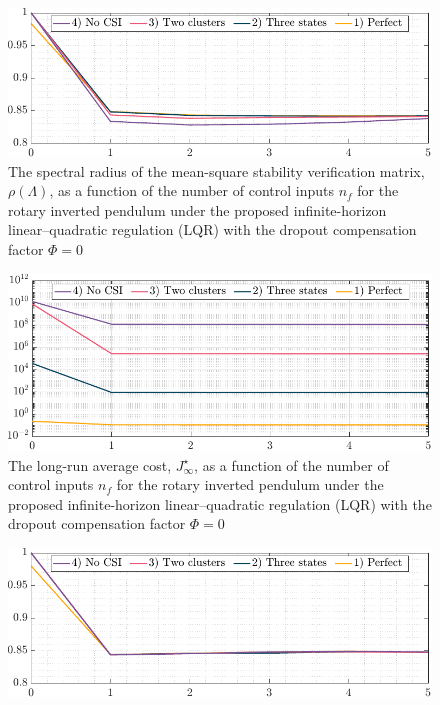 {\begin{figure}[h!]
\begin{center}
\end{center}
\end{figure}
\begin{figure}[h!]
\begin{center}
\includegraphics[width=0.8\columnwidth]{./responses-rev-1/stability-cntrl-0.pdf}
\caption{The spectral radius of the mean-square stability verification matrix, $\rho(\mathit{\Lambda})$, as a function of the number of control inputs $n_f$ for the rotary inverted pendulum under the proposed infinite-horizon linear–quadratic regulation (LQR) with the dropout compensation factor $\mathit{\Phi}=0$}\label{fig:stability-coeff-0}
\end{center}
\end{figure}
\begin{figure}[h!]
\begin{center}
\includegraphics[width=0.8\columnwidth]{./responses-rev-1/cost-cntrl-0.pdf}
\caption{The long-run average cost, $J_{\infty}^{\star}$, as a function of the number of control inputs $n_f$ for the rotary inverted pendulum under the proposed infinite-horizon linear–quadratic regulation (LQR) with the dropout compensation factor $\mathit{\Phi}=0$}\label{fig:cost-cntrl-0}
\end{center}
\end{figure}
\begin{figure}[h!]
\begin{center}
\includegraphics[width=0.8\columnwidth]{./responses-rev-1/stability-cntrl-9.pdf}

\end{center}
\end{figure}}
